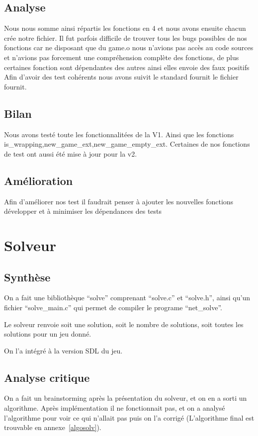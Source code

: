 \documentclass[12pt]{article}
\begin{document}
\subsection{Analyse}
Nous nous somme ainsi répartis les fonctions en 4 et nous avons ensuite chacun crée notre fichier.
Il fut parfois difficile de trouver tous les bugs possibles de nos fonctions car ne disposant que du game.o
nous n'avions pas accès au code sources et n'avions pas forcement une compréhension complète des fonctions, 
de plus certaines fonction sont dépendantes des autres ainsi elles envoie des faux positifs
Afin d'avoir des test cohérents nous avons suivit le standard fournit le fichier fournit.
\subsection{Bilan}
Nous avons testé toute les fonctionnalitées de la V1. Ainsi que les fonctions is\_wrapping,new\_game\_ext,new\_game\_empty\_ext.
Certaines de nos fonctions de test ont aussi été mise à jour pour la v2.
\subsection{Amélioration}
Afin d'améliorer nos test il faudrait penser à ajouter les nouvelles fonctions développer et à minimiser les dépendances des tests

\section{Solveur}
\subsection{Synthèse}
On a fait une bibliothèque ``solve'' comprenant ``solve.c'' et ``solve.h'', ainsi qu'un fichier ``solve\_main.c'' qui permet de compiler le programe ``net\_solve''.

Le solveur renvoie soit une solution, soit le nombre de solutions, soit toutes les solutions pour un jeu donné.

On l'a intégré à la version SDL du jeu.
\subsection{Analyse critique}
On a fait un brainstorming après la présentation du solveur, et on en a sorti un algorithme. Après implémentation il ne fonctionnait pas, et on a analysé l'algorithme pour voir ce qui n'allait pas puis on l'a corrigé (L'algorithme final est trouvable en annexe~\ref{algosolv}).
\end{document}
